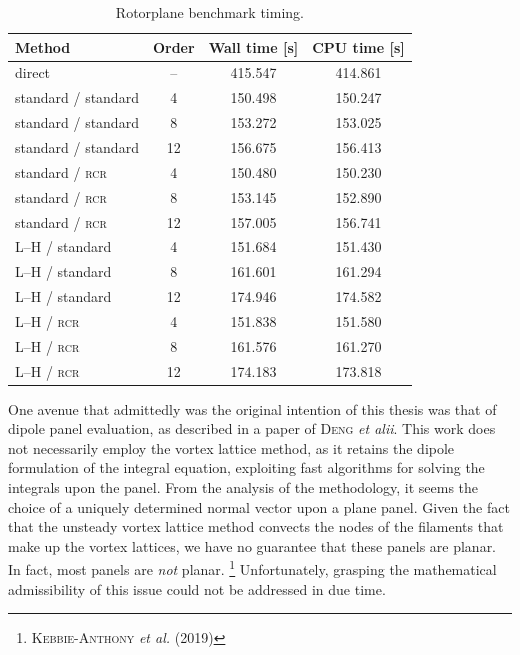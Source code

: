 \begin{table}[htbp]
  \centering
  \begin{tabular}{|l|c|c|c|}
    \hline
    Method & Order & Wall time [s] & CPU time [s] \\
    \hline
    direct & -- & 415.547 & 414.861 \\
    standard / standard & 4 & 150.498 & 150.247 \\
    standard / standard & 8 & 153.272 & 153.025 \\
    standard / standard & 12 & 156.675 & 156.413 \\
    standard / \textsc{rcr} & 4 & 150.480 & 150.230 \\
    standard / \textsc{rcr} & 8 & 153.145 & 152.890 \\
    standard / \textsc{rcr} & 12 & 157.005 & 156.741 \\
    L--H / standard & 4 & 151.684 & 151.430 \\
    L--H / standard & 8 & 161.601 & 161.294 \\
    L--H / standard & 12 & 174.946 & 174.582 \\
    L--H / \textsc{rcr} & 4 & 151.838 & 151.580 \\
    L--H / \textsc{rcr} & 8 & 161.576 & 161.270 \\
    L--H / \textsc{rcr} & 12 & 174.183 & 173.818\\
    \hline
  \end{tabular}
  \caption{Rotorplane benchmark timing.}
  \label{tab:rotorplane_time}
\end{table}


One avenue that admittedly was the original intention of this thesis was that of dipole panel evaluation, as described in a paper of \textsc{Deng} \emph{et alii}.
This work does not necessarily employ the vortex lattice method, as it retains the dipole formulation of the integral equation, exploiting fast algorithms for solving the integrals upon the panel.
From the analysis of the methodology, it seems the choice of a uniquely determined normal vector upon a plane panel.
Given the fact that the unsteady vortex lattice method convects the nodes of the filaments that make up the vortex lattices, we have no guarantee that these panels are planar.
In fact, most panels are \emph{not} planar.%
\footnote{%
  \cite{kebbie-anthony2019fast} \textsc{Kebbie-Anthony} \emph{et al.} (2019)
}
Unfortunately, grasping the mathematical admissibility of this issue could not be addressed in due time.
